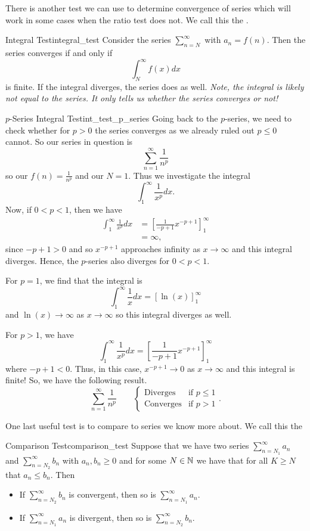 There is another test we can use to determine convergence of series which will work in some cases when the ratio test does not. We call this the .

\begin{prop}{Integral Test}{integral_test}
Consider the series $\sum_{n=N}^\infty$ with $a_n=f(n)$.  Then the series converges if and only if
\[
\int_{N}^\infty f(x)dx
\]
is finite. If the integral diverges, the series does as well. \emph{Note, the integral is likely not equal to the series. It only tells us whether the series converges or not!}
\end{prop}

\begin{ex}{$p$-Series Integral Test}{int_test_p_series}
Going back to the $p$-series, we need to check whether for $p>0$ the series converges as we already ruled out $p\leq 0$ cannot.  So our series in question is
\[
\sum_{n=1}^\infty \frac{1}{n^p}
\]
so our $f(n)=\frac{1}{n^p}$ and our $N=1$.  Thus we investigate the integral
\[
\int_1^\infty \frac{1}{x^p}dx.
\]
Now, if $0<p<1$, then we have
\begin{align*}
    \int_1^\infty \frac{1}{x^p}dx &= \left[\frac{1}{-p+1} x^{-p+1} \right]_1^\infty\\
    &= \infty,
\end{align*}
since $-p+1>0$ and so $x^{-p+1}$ approaches infinity as $x\to \infty$ and this integral diverges.  Hence, the $p$-series also diverges for $0<p<1$.

For $p=1$, we find that the integral is
\[
\int_1^\infty \frac{1}{x} dx = \left[ \ln(x) \right]_1^\infty
\]
and $\ln(x)\to \infty$ as $x\to \infty$ so this integral diverges as well.

For $p>1$, we have
\[
\int_1^\infty \frac{1}{x^p}dx = \left[ \frac{1}{-p+1}x^{-p+1}\right]_1^\infty
\]
where $-p+1<0$. Thus, in this case, $x^{-p+1}\to 0$ as $x\to \infty$ and this integral is finite!  So, we have the following result.
\[
\sum_{n=1}^\infty \frac{1}{n^p} \qquad \begin{cases} \textrm{Diverges} & \textrm{if $p\leq 1$} \\
\textrm{Converges} & \textrm{if $p>1$}\end{cases}.
\]
\end{ex}

One last useful test is to compare to series we know more about. We call this the 

\begin{prop}{Comparison Test}{comparison_test}
Suppose that we have two series $\sum_{n=N_1}^\infty a_n$ and $\sum_{n=N_2}^\infty b_n$ with $a_n,b_n\geq 0$ and for some $N \in \mathbb{N}$ we have that for all $K\geq N$ that $a_n\leq b_n$. Then
\begin{itemize}
    \item If $\sum_{n=N_2}^\infty b_n$ is convergent, then so is $\sum_{n=N_1}^\infty a_n$.
    \item If $\sum_{n=N_1}^\infty a_n$ is divergent, then so is $\sum_{n=N_2}^\infty b_n$.
\end{itemize}
\end{prop}

